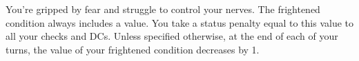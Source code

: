 

You're gripped by fear and struggle to control your nerves.
The frightened condition always includes a value.
You take a status penalty equal to this value to all your checks and DCs.
Unless specified otherwise, at the end of each of your turns, the value of your frightened condition decreases by 1.
